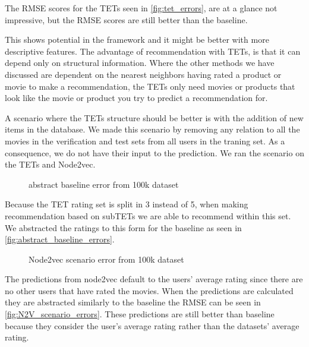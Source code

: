The RMSE scores for the TETs seen in \autoref{fig:tet_errors}, are at a glance not impressive, but the RMSE scores are still better than the baseline.

This shows potential in the framework and it might be better with more descriptive features. The advantage of recommendation with TETs, is that it can depend only on structural information.
Where the other methods we have discussed are dependent on the nearest neighbors having rated a product or movie to make a recommendation, the TETs only need movies or products that look like the movie or product you try to predict a recommendation for.

A scenario where the TETs structure should be better is with the addition of new items in the database.
We made this scenario by removing any relation to all the movies in the verification and test sets from all users in the traning set.
As a consequence, we do not have their input to the prediction.
We ran the scenario on the TETs and Node2vec.

\begin{figure}[H]
	\centering
	\begin{adjustbox}{width=0.5\textwidth}
		
	\end{adjustbox}
	\caption{abstract baseline error from 100k dataset}
	\label{fig:abstract_baseline_errors}
\end{figure}

Because the TET rating set is split in 3 instead of 5, when making recommendation based on subTETs we are able to recommend within this set.
We abstracted the ratings to this form for the baseline as seen in \autoref{fig:abstract_baseline_errors}.

\begin{figure}[H]
	\centering
	\begin{adjustbox}{width=0.5\textwidth}
		
	\end{adjustbox}
	\caption{Node2vec scenario error from 100k dataset}
	\label{fig:N2V_scenario_errors}
\end{figure}

The predictions from node2vec default to the users' average rating since there are no other users that have rated the movies.
When the predictions are calculated they are abstracted similarly to the baseline the RMSE can be seen in \autoref{fig:N2V_scenario_errors}. 
These predictions are still better than baseline because they consider the user's average rating rather than the datasets' average rating.

